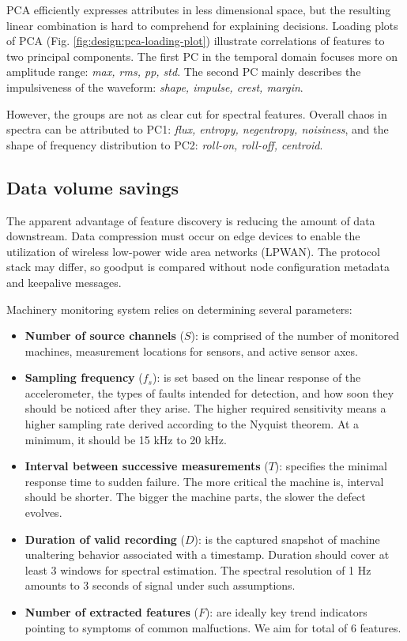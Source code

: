 PCA efficiently expresses attributes in less dimensional space, but the resulting linear combination is hard to comprehend for explaining decisions. Loading plots of PCA (Fig. \ref{fig:design:pca-loading-plot}) illustrate correlations of features to two principal components. The first PC in the temporal domain focuses more on amplitude range: \emph{max, rms, pp, std}. The second PC mainly describes the impulsiveness of the waveform: \emph{shape, impulse, crest, margin}. 

However, the groups are not as clear cut for spectral features. Overall chaos in spectra can be attributed to PC1: \emph{flux, entropy, negentropy, noisiness}, and the shape of frequency distribution to PC2: \emph{roll-on, roll-off, centroid}.


\subsection{Data volume savings}
The apparent advantage of feature discovery is reducing the amount of data downstream. Data compression must occur on edge devices to enable the utilization of wireless low-power wide area networks (LPWAN). The protocol stack may differ, so goodput is compared without node configuration metadata and keepalive messages. 

Machinery monitoring system relies on determining several parameters:
\begin{itemize}
\itemsep0pt
\item \textbf{Number of source channels} ($S$): is comprised of the number of monitored machines, measurement locations for sensors, and active sensor axes.
\item \textbf{Sampling frequency} ($f_s$): is set based on the linear response of the accelerometer, the types of faults intended for detection, and how soon they should be noticed after they arise. The higher required sensitivity means a higher sampling rate derived according to the Nyquist theorem. At a minimum, it should be 15 kHz to 20 kHz.
\item \textbf{Interval between successive measurements} ($T$): specifies the minimal response time to sudden failure. The more critical the machine is, interval should be shorter. The bigger the machine parts, the slower the defect evolves.
\item \textbf{Duration of valid recording} ($D$): is the captured snapshot of machine unaltering behavior associated with a timestamp. Duration should cover at least 3 windows for spectral estimation. The spectral resolution of 1 Hz amounts to 3 seconds of signal under such assumptions.
\item \textbf{Number of extracted features} ($F$): are ideally key trend indicators pointing to symptoms of common malfuctions. We aim for total of 6 features.
\end{itemize}

